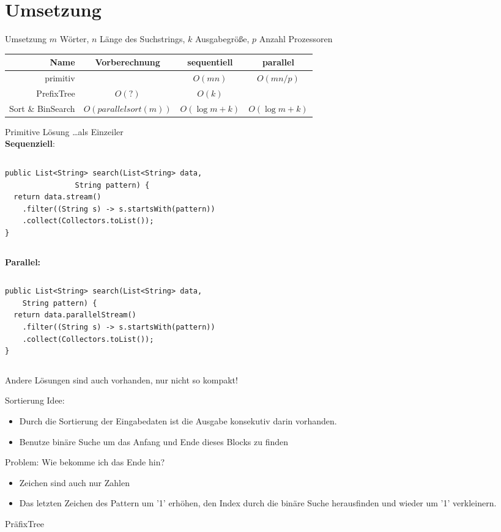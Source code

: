 \documentclass[11pt, xcolor=dvipsnames]{beamer}
\begin{document}
	\section{Umsetzung}
	\begin{frame}{Umsetzung}
		$m$ Wörter, $n$ Länge des Suchstrings, $k$ Ausgabegröße, $p$ Anzahl Prozessoren 
		\centering
		\begin{tabular}{r|ccc}
		Name	&  Vorberechnung & sequentiell & parallel \\ 
		\hline
		primitiv	& &$O(mn)$ & $O(mn/p)$ \\ 
		PrefixTree	& $O(?)$ & $O(k)$ & \\
		Sort \& BinSearch & $O(parallelsort(m))$ & $O(\log m + k)$ & $O(\log m + k)$
		\end{tabular} 
	\end{frame}
\begin{frame}[fragile]{Primitive Lösung}
	\ldots als Einzeiler\\
	\textbf{Sequenziell}:
	\begin{columns}[T]
		\begin{column}{\textwidth}
			\begin{lstlisting}
public List<String> search(List<String> data, 
				String pattern) {
  return data.stream()
    .filter((String s) -> s.startsWith(pattern))
    .collect(Collectors.toList());
}
			\end{lstlisting}
		\end{column}
	\end{columns}
	\textbf{Parallel:}
	\begin{columns}
		\begin{column}{\textwidth}
\begin{lstlisting}
public List<String> search(List<String> data, 
	String pattern) {
  return data.parallelStream()
    .filter((String s) -> s.startsWith(pattern))
    .collect(Collectors.toList());
}
\end{lstlisting}
			\end{column}
		\end{columns}
		Andere Lösungen sind auch vorhanden, nur nicht so kompakt!
\end{frame}
	\begin{frame}{Sortierung}
		Idee:
		\begin{itemize}
			\item Durch die Sortierung der Eingabedaten ist die Ausgabe konsekutiv darin vorhanden. 
			\item Benutze binäre Suche um das Anfang und Ende dieses Blocks zu finden
		\end{itemize}
		Problem: Wie bekomme ich das Ende hin?
		\begin{itemize}
			\item Zeichen sind auch nur Zahlen
			\item Das letzten Zeichen des Pattern um '1' erhöhen, den Index durch die binäre Suche herausfinden und wieder um '1' verkleinern.  
		\end{itemize}
	\end{frame}
	
	\begin{frame}{PräfixTree}
		
	\end{frame}
\end{document}
